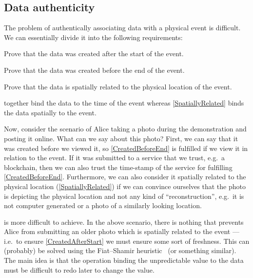 \subsection{Data authenticity}
\label{DataAuthenticity}

The problem of authentically associating data with a physical event is 
difficult.
We can essentially divide it into the following requirements:
\begin{frame}
\begin{requirements}[A]
  \item\label{CreatedAfterStart} Prove that the data was created after the 
    start of the event.
  \item\label{CreatedBeforeEnd} Prove that the data was created before the end 
    of the event.
  \item\label{SpatiallyRelated} Prove that the data is spatially related to the 
    physical location of the event.
\end{requirements} %
\end{frame}
 together bind the data to the time of 
the event whereas \cref{SpatiallyRelated} binds the data spatially to the 
event.

Now, consider the scenario of Alice taking a photo during the demonstration and 
posting it online.
What can we say about this photo?
First, we can say that it was created before we viewed it, so 
\cref{CreatedBeforeEnd} is fulfilled if we view it in relation to the event.
If it was submitted to a service that we trust, e.g.\ a blockchain, then we can 
also trust the time-stamp of the service for fulfilling 
\cref{CreatedBeforeEnd}.
Furthermore, we can also consider it spatially related to the physical location
(\cref{SpatiallyRelated}) if we can convince ourselves that the photo is 
depicting the physical location and not any kind of \enquote{reconstruction}, 
e.g.\ it is not computer generated or a photo of a similarly looking location.

 is more difficult to achieve.
In the above scenario, there is nothing that prevents Alice from submitting an 
older photo which is spatially related to the event --- i.e.\ to ensure 
\cref{CreatedAfterStart} we must ensure some sort of freshness.
This can (probably) be solved using the Fiat--Shamir 
heuristic~\cite{FiatShamirHeuristic} (or something similar).
The main idea is that the operation binding the unpredictable value to the data 
must be difficult to redo later to change the value.

